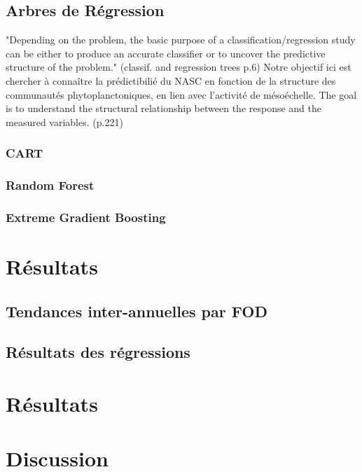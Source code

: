 \documentclass{article}
\begin{document}
	\subsection{Arbres de Régression}
	"Depending on the problem, the basic purpose of a classification/regression study can be either to produce an accurate classifier or to uncover the predictive structure of the problem." (classif. and regression trees p.6)
	Notre objectif ici est chercher à connaître la prédictibilié du NASC en fonction de la structure des communautés phytoplanctoniques, en lien avec l'activité de mésoéchelle. The goal is to understand the structural relationship between  the response and the measured variables. (p.221)
	
	\subsubsection{CART}
	
	\subsubsection{Random Forest}
	
	\subsubsection{Extreme Gradient Boosting}
	
	\section{Résultats}
	\subsection{Tendances inter-annuelles par FOD}
	\subsection{Résultats des régressions}
	
	\section{Résultats}
	
	\section{Discussion}
	
\end{document}
